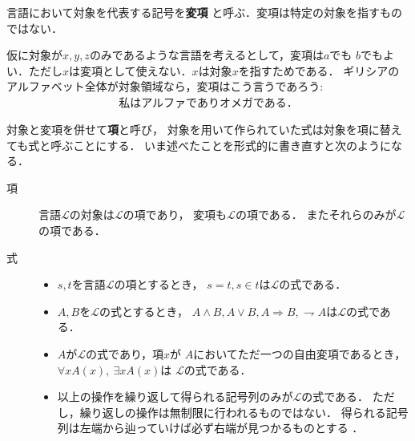 	\begin{screen}
		\begin{dfn}[変項]
			言語において対象を代表する記号を{\bf 変項}
			と呼ぶ．変項は特定の対象を指すものではない．
		\end{dfn}
	\end{screen}
	
	仮に対象が$x,y,z$のみであるような言語を考えるとして，変項は$a$でも
	$b$でもよい．ただし$x$は変項として使えない．$x$は対象$x$を指すためである．
	ギリシアのアルファベット全体が対象領域なら，変項はこう言うであろう:
	\begin{align}
		\mbox{私はアルファでありオメガである．}
	\end{align}
	
	対象と変項を併せて{\bf 項}と呼び，
	対象を用いて作られていた式は対象を項に替えても式と呼ぶことにする．
	いま述べたことを形式的に書き直すと次のようになる．
	\begin{description}
		\item[項] 言語$\mathcal{L}$の対象は$\mathcal{L}$の項であり，
			変項も$\mathcal{L}$の項である．
			またそれらのみが$\mathcal{L}$の項である．
			
		\item[式] 
			\begin{itemize}
				\item $s,t$を言語$\mathcal{L}$の項とするとき，
					$s=t,s \in t$は$\mathcal{L}$の式である．
					
				\item $A,B$を$\mathcal{L}$の式とするとき，
					$A \wedge B,A \vee B,A\Longrightarrow B,
					\rightharpoondown A$は$\mathcal{L}$の式である．
				
				\item $A$が$\mathcal{L}$の式であり，項$x$が
					$A$においてただ一つの自由変項であるとき，
					$\forall x A(x),\ \exists x A(x)$は
					$\mathcal{L}$の式である．
				
				\item 以上の操作を繰り返して得られる記号列のみが$\mathcal{L}$の式である．
					ただし，繰り返しの操作は無制限に行われるものではない．
					得られる記号列は左端から辿っていけば必ず右端が見つかるものとする
					\footnotemark．
			\end{itemize}
	\end{description}
	
